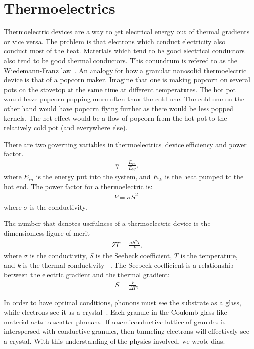 \section{Thermoelectrics}
Thermoelectric devices are a way to get electrical energy out of thermal gradients or vice versa. The problem is that electrons which conduct electricity also conduct most of the heat. Materials which tend to be good electrical conductors also tend to be good thermal conductors. This conundrum is refered to as the Wiedemann-Franz law~\cite{glatz09}. An analogy for how a granular nanosolid thermoelectric device is that of a popcorn maker. Imagine that one is making popcorn on several pots on the stovetop at the same time at different temperatures. The hot pot would have popcorn popping more often than the cold one. The cold one on the other hand would have popcorn flying further as there would be less popped kernels. The net effect would be a flow of popcorn from the hot pot to the relatively cold pot (and everywhere else).  

	There are two governing variables in thermoelectrics, device efficiency and power factor. 
\begin{eqnarray}
\eta = \frac{E_{in}}{E_{W}},
\label{efficiency}
\end{eqnarray}
where $E_{in}$ is the energy put into the system, and $E_{W}$ is the heat pumped to the hot end. The power factor for a thermoelectric is:
\begin{eqnarray}
P = \sigma S^2,
\label{power}
\end{eqnarray}
where $\sigma$ is the conductivity.

 The number that denotes usefulness of a thermoelectric device is the dimensionless figure of merit
\begin{eqnarray}
ZT = \frac{\sigma S^2 T}{k},
\label{ZT}
\end{eqnarray}
where $\sigma$ is the conductivity, $S$ is the Seebeck coefficient, $T$ is the temperature, and $k$ is the thermal conductivity ~\cite{chen}. The Seebeck coefficient is a relationship between the electric gradient and the thermal gradient:
\begin{eqnarray}
S = \frac{V}{\Delta T},
\label{Seebeck}
\end{eqnarray}

In order to have optimal conditions, phonons must see the substrate as a glass, while electrons see it as a crystal~\cite{Rowe05}. Each granule in the Coulomb glass-like material acts to scatter phonons. If a semiconductive lattice of granules is interspersed with conductive granules, then tunneling electrons will effectively see a crystal. With this understanding of the physics involved, we wrote {\sc dias}.  

